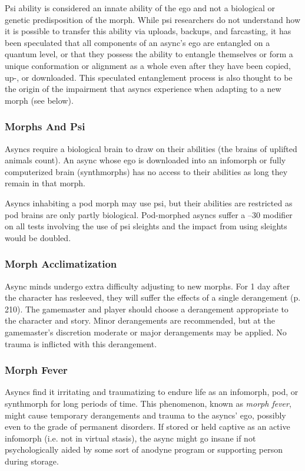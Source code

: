 Psi ability is considered an innate ability of the 
ego and not a biological or genetic predisposition of 
the morph. While psi researchers do not understand 
how it is possible to transfer this ability via uploads, 
backups, and farcasting, it has been speculated that 
all components of an async's ego are entangled on a 
quantum level, or that they possess the ability to entangle
themselves or form a unique conformation or
alignment as a whole even after they have been copied, 
up-, or downloaded. This speculated entanglement 
process is also thought to be the origin of the impairment
that asyncs experience when adapting to a new
morph (see below).

\subsubsection{Morphs And Psi}

Asyncs require a biological brain to draw on their 
abilities (the brains of uplifted animals count). An 
async whose ego is downloaded into an infomorph or 
fully computerized brain (synthmorphs) has no access 
to their abilities as long they remain in that morph.

Asyncs inhabiting a pod morph may use psi, but 
their abilities are restricted as pod brains are only 
partly biological. Pod-morphed asyncs suffer a –30 
modifier on all tests involving the use of psi sleights 
and the impact from using sleights would be doubled.

\subsubsection{Morph Acclimatization}

Async minds undergo extra difficulty adjusting to new 
morphs. For 1 day after the character has resleeved, 
they will suffer the effects of a single derangement 
(p. 210). The gamemaster and player should choose a 
derangement appropriate to the character and story. 
Minor derangements are recommended, but at the 
gamemaster's discretion moderate or major derangements
may be applied. No trauma is inflicted with
this derangement.

\subsubsection{Morph Fever}

Asyncs find it irritating and traumatizing to endure life 
as an infomorph, pod, or synthmorph for long periods 
of time. This phenomenon, known as \textit{morph fever}, 
might cause temporary derangements and trauma to 
the asyncs' ego, possibly even to the grade of permanent
disorders. If stored or held captive as an active
infomorph (i.e. not in virtual stasis), the async might 
go insane if not psychologically aided by some sort of 
anodyne program or supporting person during storage.

